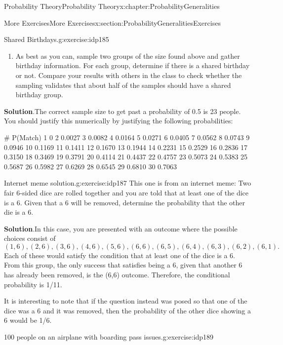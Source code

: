 \documentclass[oneside,10pt,]{book}
\newcommand{\blocktitlefont}{\relax}
\numberwithin{equation}{section}
\begin{document}
\begin{chapterptx}{Probability Theory}{}{Probability Theory}{}{}{x:chapter:ProbabilityGeneralities}
\begin{sectionptx}{More Exercises}{}{More Exercises}{}{}{x:section:ProbabilityGeneralitiesExercises}
\begin{inlineexercise}{Shared Birthdays.}{g:exercise:idp185}
\begin{enumerate}
\item{}As best as you can, sample two groups of the size found above and gather birthday information. For each group, determine if there is a shared birthday or not.  Compare your results with others in the class to check whether the sampling validates that about half of the samples should have a shared birthday group.%
\end{enumerate}
%
\par\smallskip%
\noindent\textbf{\blocktitlefont Solution}.\hypertarget{g:solution:idp186}{}\quad{}The correct sample size to get past a probability of 0.5 is 23 people. You should justify this numerically by justifying the following probabilities:\begin{preformatted}
#	P(Match)	
1	0
2	0.0027
3	0.0082
4	0.0164
5	0.0271
6	0.0405
7	0.0562
8	0.0743
9	0.0946
10	0.1169
11	0.1411
12	0.1670
13	0.1944
14	0.2231
15	0.2529
16	0.2836
17	0.3150
18	0.3469
19	0.3791
20	0.4114
21	0.4437
22	0.4757
23	0.5073
24	0.5383
25	0.5687
26	0.5982
27	0.6269
28	0.6545
29	0.6810
30	0.7063
\end{preformatted}
%
\end{inlineexercise}%
\begin{inlineexercise}{Internet meme solution.}{g:exercise:idp187}%
This one is from an internet meme:  Two fair 6-sided dice are rolled together and you are told that at least one of the dice is a 6. Given that a 6 will be removed, determine the probability that the other die is a 6.%
\par\smallskip%
\noindent\textbf{\blocktitlefont Solution}.\hypertarget{g:solution:idp188}{}\quad{}In this case, you are presented with an outcome where the possible choices consist of%
\begin{equation*}
(1,6), (2,6), (3,6), (4,6), (5,6), (6,6), (6,5), (6,4), (6,3), (6,2), (6,1).
\end{equation*}
Each of these would satisfy the condition that at least one of the dice is a 6. From this group, the only success that satisfies being a 6, given that another 6 has already been removed, is the (6,6) outcome. Therefore, the conditional probability is 1\slash{}11.%
\par
It is interesting to note that if the question instead was posed so that one of the dice was a 6 and it was removed, then the probability of the other dice showing a 6 would be 1\slash{}6.%
\end{inlineexercise}%
\begin{inlineexercise}{100 people on an airplane with boarding pass issues.}{g:exercise:idp189}%

\end{inlineexercise}
\end{sectionptx}
\end{chapterptx}
\end{document}
